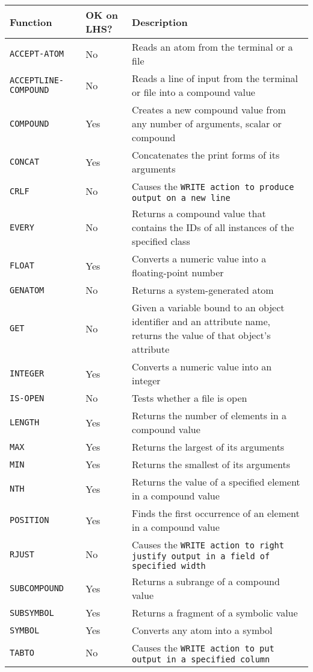 \begin{longtable}{p{3.8cm}p{2.5cm}p{8.7cm}}
  \toprule
  Function & \raggedright OK on LHS? & Description \\
  \midrule
  \tt{ACCEPT-ATOM} & No & Reads an atom from the terminal  or a file \\\addlinespace
  \tt{ACCEPTLINE-COMPOUND} & No & Reads a line of input from the terminal or file into a compound value \\\addlinespace
  \tt{COMPOUND} & Yes & Creates a new compound value from any number of arguments, scalar or compound \\\addlinespace
  \tt{CONCAT} & Yes & Concatenates the print forms of its arguments \\\addlinespace
  \tt{CRLF} & No & Causes the \tt{WRITE} action to produce output on a new line  \\\addlinespace
  \tt{EVERY} & No & Returns a compound value that contains the IDs of all instances of the specified class \\\addlinespace
  \tt{FLOAT} & Yes & Converts a numeric value into a floating-point number \\\addlinespace
  \tt{GENATOM} & No & Returns a system-generated atom \\\addlinespace
  \tt{GET} & No & Given a variable bound to an object identifier and an attribute name, returns the value of that object's attribute \\\addlinespace
  \tt{INTEGER} & Yes & Converts a numeric value into an integer \\\addlinespace
  \tt{IS-OPEN} & No & Tests whether a file is open \\\addlinespace
  \tt{LENGTH} & Yes & Returns the number of elements in a compound value \\\addlinespace
  \tt{MAX} & Yes &  Returns the largest of its arguments \\\addlinespace
  \tt{MIN} & Yes & Returns the smallest of its  arguments \\\addlinespace
  \tt{NTH} & Yes & Returns the value of a specified element in a compound value \\\addlinespace
  \tt{POSITION} & Yes & Finds the first occurrence of  an element in a compound value \\\addlinespace
  \tt{RJUST} & No & Causes the \tt{WRITE} action to right justify output in a field of specified width \\\addlinespace
  \tt{SUBCOMPOUND} & Yes & Returns a subrange of a compound value \\\addlinespace
  \tt{SUBSYMBOL} & Yes & Returns a fragment of a symbolic value \\\addlinespace
  \tt{SYMBOL} & Yes & Converts any atom into a symbol \\\addlinespace
  \tt{TABTO} & No & Causes the \tt{WRITE} action to put output in a specified column \\
  \bottomrule
\end{longtable}

